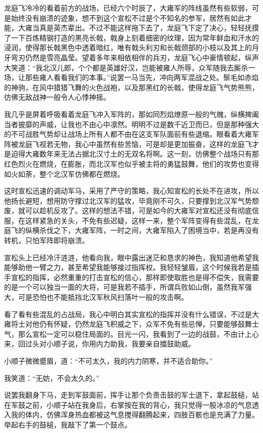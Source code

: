 龙庭飞冷冷的看着前方的战场，已经六个时辰了，大雍军的阵线虽然有些软弱，可是始终没有崩溃的迹象，想不到这个宣松不过是个不知名的参军，居然有如此才能，大雍当真是英杰辈出。不过不能这样拖下去了，龙庭飞下定了决心，轻轻抚摸了一下百炼精钢打造的黑亮长戟，戟身上刻着细密的纹理，因为常年鲜血和汗水的浸润，使得那长戟黑色中透着暗红，唯有戟头利刃和长戟颈部的小枝以及其上的月牙弯刃仍然是雪亮晶莹。望着多年来相依相伴的兵刃，龙庭飞心中豪情顿起，纵声大笑道：“我北汉儿郎，个个都是英雄好汉，岂能被雍人所辱，众军随我去厮杀一场，让那些雍人看看我们的本事。”说罢一马当先，冲向两军混战之处。鬃毛如赤焰的神驹，在风中猎猎飞舞的火色战袍，以及那黑红的长戟，使得龙庭飞气势熊熊，彷佛无敌战神一般令人心悸神摇。

我几乎是屏着呼吸看着龙庭飞冲入军阵的，那如同烈焰燎原一般的气魄，纵横捭阖当者披靡的声威，让我也不由心中凛然。明明不过是数千近卫而已，但是那种强大的不可战胜气势却让战场上所有人都不由在这支军队面前有些退缩。眼看着大雍军阵被龙庭飞视若无物，我心中虽然有些苦恼，可是却是更加振奋，这样的龙庭飞才是迫得大雍数年来无法占据北汉寸土的无双名将啊。这一刻，彷佛整个战场只有那红色烈火在燃烧，在膨胀，而北汉军也似乎被主将的勇猛鼓舞，他们的攻势也变得如火如荼，整个北汉军仿佛都在燃烧。

这时宣松迅速的调动军马，采用了严守的策略，我心知宣松的长处不在进攻，所以他扬长避短，想用防守撑过北汉军的猛攻，毕竟刚不可久，只要撑到北汉军气势颓废，就可以趁机反攻了。这样的想法不错，可是如今的大雍军对宣松还没有彻底信服，在这样紧急的关头，不免有些迟疑，这样一来，整个军阵变得有些混乱，在龙庭飞的纵横杀伐之下，大雍军阵，一时之间，大雍军陷入了困境当中，若是再没有转机，只怕军阵即将崩溃。

宣松头上已经冷汗涟涟，他看向我，眼中露出迷茫和恳求的神色，我知道他希望我能够助他一臂之力，甚至希望我能够接过指挥权。我轻轻皱眉，这个时候我若是插手宣松的指挥，必然重重的打击宣松的信心，那样即使取胜也是得不偿失，我需要的是一个可以独当一面的大将，可是我若不插手，所谓兵败如山倒，虽然我军强大，可是恐怕也不能抵挡北汉军秋风扫落叶一般的攻击啊。

看了看有些混乱的占战局，我心中明白其实宣松的指挥并没有什么错误，不过是大雍将士对他仍有怀疑，仍然龙庭飞积威之下，众军不免有些忌惮，只要能够鼓舞士气，那么宣松一定可以稳住局面的。目光一闪，我看到了一边的战鼓，不由计上心来，回过头对小顺子说，你用内力助我，我要亲自擂鼓助威。

小顺子微微蹙眉，道：“不可太久，我的内力阴寒，并不适合助你。”

我笑道：“无妨，不会太久的。”

说罢我翻身下马，走到军鼓面前，挥手让那个负责击鼓的军士退下，拿起鼓槌，站在军鼓之前，小顺子站在我身后，右掌按在我的背心，我只觉得一股冰凉的气息透入我的体内，仿佛浑身热血都被这气息搅得翻腾起来，四肢百骸也是充满了力量。举起右手的鼓槌，我敲下了第一个鼓点。

